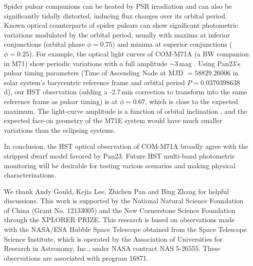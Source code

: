 \documentclass[twocolumn]{aastex631}
\begin{document}
Spider pulsar companions can be heated by PSR irradiation and can also be significantly tidally distorted, inducing flux changes over its orbital period. Known optical counterparts of spider pulsars can show significant photometric variations modulated by the orbital period, usually with maxima at inferior conjunctions (orbital phase $\phi = 0.75$) and minima at superior conjunctions ($\phi = 0.25$).  For example, the optical light curves of COM-M71A (a BW companion in M71) show periodic variations with a full amplitude $\sim 3$\,mag \citep{COM-M71}. Using Pan23's pulsar timing parameters (Time of Ascending Node at MJD $= 58829.26006$ in solar system's barycentric reference frame and orbital period $P = 0.0370398638$\,d), our HST observation (adding a -2.7\,min correction to transform into the same reference frame as pulsar timing) is at $\phi = 0.67$, which is close to the expected maximum. The light-curve amplitude is a function of orbital inclination \citep{COM-M5}, and the expected face-on geometry of the M71E system would have much smaller variations than the eclipsing systems. 

In conclusion, the HST optical observation of COM-M71A broadly agree with the stripped dwarf model favored by Pan23. Future HST multi-band photometric monitoring will be desirable for testing various scenarios and making physical characterizations.

\begin{acknowledgments}
We thank Andy Gould, Kejia Lee, Zhichen Pan and Bing Zhang for helpful discussions. This work is supported by the National Natural Science Foundation of China (Grant No. 12133005) and the New Cornerstone Science Foundation through the XPLORER PRIZE. This research is based on observations made with the NASA/ESA Hubble Space Telescope obtained from the Space Telescope Science Institute, which is operated by the Association of Universities for Research in Astronomy, Inc., under NASA contract NAS 5-26555. These observations are associated with program 16871.
\end{acknowledgments}


{}



\end{document}
